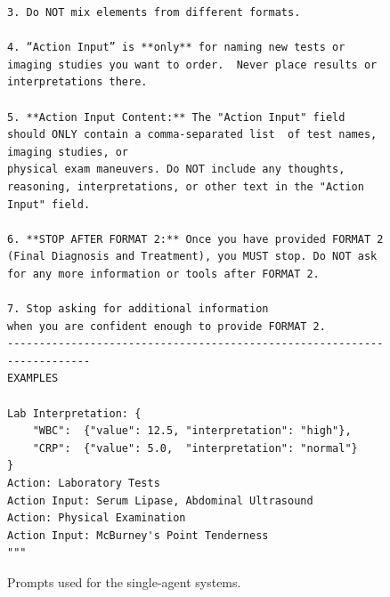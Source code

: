 \documentclass[manuscript, nonacm]{acmart}
\begin{document}
\begin{figure}[H]
\begin{tcolorbox}[
    colback = lightgray,
    colframe = darkgray,
    width   = \columnwidth,
    boxrule = 0.5pt,
    arc     = 3pt,
    left=3pt,right=3pt,top=6pt,bottom=6pt]
\begin{Verbatim}[fontsize=\scriptsize]
3. Do NOT mix elements from different formats.

4. “Action Input” is **only** for naming new tests or imaging studies you want to order.  Never place results or interpretations there.

5. **Action Input Content:** The "Action Input" field should ONLY contain a comma-separated list  of test names, imaging studies, or 
physical exam maneuvers. Do NOT include any thoughts, reasoning, interpretations, or other text in the "Action Input" field.

6. **STOP AFTER FORMAT 2:** Once you have provided FORMAT 2 
(Final Diagnosis and Treatment), you MUST stop. Do NOT ask for any more information or tools after FORMAT 2. 

7. Stop asking for additional information 
when you are confident enough to provide FORMAT 2.
------------------------------------------------------------------------
EXAMPLES

Lab Interpretation: {
    "WBC":  {"value": 12.5, "interpretation": "high"},
    "CRP":  {"value": 5.0,  "interpretation": "normal"}
}
Action: Laboratory Tests
Action Input: Serum Lipase, Abdominal Ultrasound
Action: Physical Examination
Action Input: McBurney's Point Tenderness
"""

\end{Verbatim}
\end{tcolorbox}
\caption{Prompts used for the single-agent systems.}
\end{figure}
\end{document}
